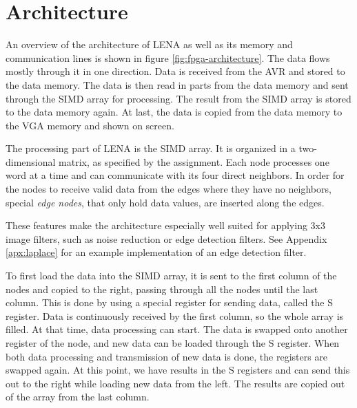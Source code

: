 \section{Architecture}



An overview of the architecture of \ac{LENA} as well as its memory and
communication lines is shown in figure \ref{fig:fpga-architecture}. The data
flows mostly through it in one direction. Data is received from the AVR and
stored to the data memory. The data is then read in parts from the data memory
and sent through the \ac{SIMD} array for processing. The result from the
\ac{SIMD} array is stored to the data memory again.  At last, the data is copied
from the data memory to the \ac{VGA} memory and shown on screen.

The processing part of \ac{LENA} is the \ac{SIMD} array. It is organized
in a two-dimensional matrix, as specified by the assignment. Each node
processes one word at a time and can communicate with its four direct
neighbors. In order for the nodes to receive valid data from the edges
where they have no neighbors, special \emph{edge nodes}, that only hold
data values, are inserted along the edges.

These features make the architecture especially well suited for applying
3x3 image filters, such as noise reduction or edge detection filters.
See Appendix \ref{apx:laplace} for an example implementation of an edge
detection filter. 

To first load the data into the \ac{SIMD} array, it is sent to the first column
of the nodes and copied to the right, passing through all the nodes until the
last column. This is done by using a special register for sending data, called
the S register. Data is continuously received by the first column, so the whole
array is filled. At that time, data processing can start. The data is swapped
onto another register of the node, and new data can be loaded through the S
register. When both data processing and transmission of new data is done, the
registers are swapped again. At this point, we have results in the S registers
and can send this out to the right while loading new data from the left. The
results are copied out of the array from the last column.

